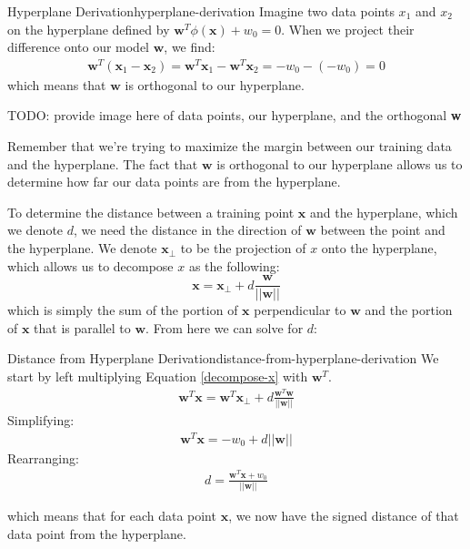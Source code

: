 \begin{derivation}{Hyperplane Derivation}{hyperplane-derivation}
	Imagine two data points $x_{1}$ and $x_{2}$ on the hyperplane defined by $\textbf{w}^{T}\phi(\textbf{x}) + w_{0} = 0$. When we project their difference onto our model $\textbf{w}$, we find:
	\begin{align*}
		\textbf{w}^{T}(\textbf{x}_{1} - \textbf{x}_{2}) = \textbf{w}^{T}\textbf{x}_{1} - \textbf{w}^{T}\textbf{x}_{2} = -w_{0} - (-w_{0}) = 0
	\end{align*}
	which means that $\textbf{w}$ is orthogonal to our hyperplane.
\end{derivation}
TODO: provide image here of data points, our hyperplane, and the orthogonal \textbf{w}

Remember that we're trying to maximize the margin between our training data and the hyperplane. The fact that $\textbf{w}$ is orthogonal to our hyperplane allows us to determine how far our data points are from the hyperplane.

To determine the distance between a training point $\textbf{x}$ and the hyperplane, which we denote $d$, we need the distance in the direction of $\textbf{w}$ between the point and the hyperplane. We denote $\textbf{x}_{\perp}$ to be the projection of $x$ onto the hyperplane, which allows us to decompose $x$ as the following:
\begin{equation} \label{decompose-x}
	\textbf{x} = \textbf{x}_{\perp} + d \frac{\textbf{w}}{|| \textbf{w} ||}
\end{equation}
which is simply the sum of the portion of $\textbf{x}$ perpendicular to $\textbf{w}$ and the portion of $\textbf{x}$ that is parallel to $\textbf{w}$. From here we can solve for $d$:
\begin{derivation}{Distance from Hyperplane Derivation}{distance-from-hyperplane-derivation}
	We start by left multiplying Equation \ref{decompose-x} with $\textbf{w}^{T}$.
	\begin{align*}
		\textbf{w}^{T}\textbf{x} = \textbf{w}^{T}\textbf{x}_{\perp} + d \frac{\textbf{w}^{T}\textbf{w}}{||\textbf{w}||}
	\end{align*}
	Simplifying:
	\begin{align*}
		\textbf{w}^{T}\textbf{x} =  - w_{0} + d ||\textbf{w}||
	\end{align*}
	Rearranging:
	\begin{align*}
		d = \frac{\textbf{w}^{T}\textbf{x} + w_{0}}{||\textbf{w}||}
	\end{align*}
\end{derivation}
which means that for each data point $\textbf{x}$, we now have the signed distance of that data point from the hyperplane.

